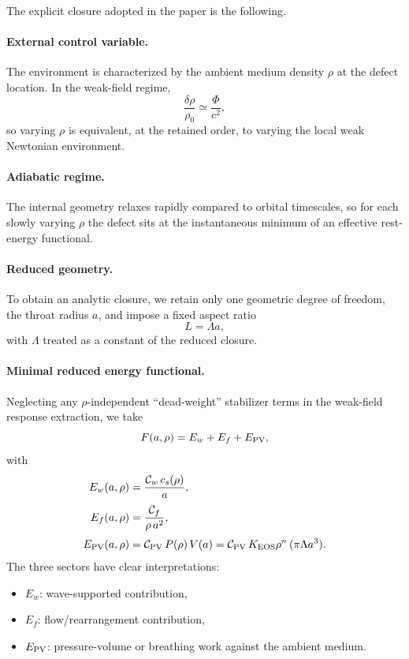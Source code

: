 \documentclass[11pt]{article}
\newcommand{\KEOS}{K_{\mathrm{EOS}}}
\newcommand{\PhiN}{\Phi}
\begin{document}
The explicit closure adopted in the paper is the following.

\paragraph{External control variable.}
The environment is characterized by the ambient medium density \(\rho\) at the defect
location. In the weak-field regime,
\begin{equation}
\frac{\delta\rho}{\rho_0}\simeq \frac{\PhiN}{c^2},
\label{eq:app-rho-phi-relation}
\end{equation}
so varying \(\rho\) is equivalent, at the retained order, to varying the local weak
Newtonian environment.

\paragraph{Adiabatic regime.}
The internal geometry relaxes rapidly compared to orbital timescales, so for each slowly
varying \(\rho\) the defect sits at the instantaneous minimum of an effective rest-energy
functional.

\paragraph{Reduced geometry.}
To obtain an analytic closure, we retain only one geometric degree of freedom, the throat
radius \(a\), and impose a fixed aspect ratio
\begin{equation}
L=\Lambda a,
\label{eq:app-fixed-aspect}
\end{equation}
with \(\Lambda\) treated as a constant of the reduced closure.

\paragraph{Minimal reduced energy functional.}
Neglecting any \(\rho\)-independent ``dead-weight'' stabilizer terms in the weak-field
response extraction, we take
\begin{equation}
F(a,\rho)=E_w+E_f+E_{\rm PV},
\label{eq:app-F-closure}
\end{equation}
with
\begin{align}
E_w(a,\rho)
&=
\frac{\mathcal C_w\,c_s(\rho)}{a},
\label{eq:app-Ew}
\\[3pt]
E_f(a,\rho)
&=
\frac{\mathcal C_f}{\rho\,a^2},
\label{eq:app-Ef}
\\[3pt]
E_{\rm PV}(a,\rho)
&=
\mathcal C_{\rm PV}\,P(\rho)\,V(a)
=
\mathcal C_{\rm PV}\,\KEOS \rho^n\,(\pi\Lambda a^3).
\label{eq:app-EPV}
\end{align}
The three sectors have clear interpretations:
\begin{itemize}[leftmargin=1.5em]
  \item \(E_w\): wave-supported contribution,
  \item \(E_f\): flow/rearrangement contribution,
  \item \(E_{\rm PV}\): pressure-volume or breathing work against the ambient medium.
\end{itemize}
\end{document}
